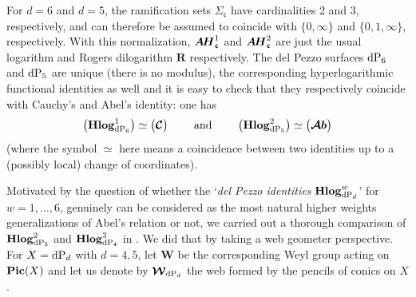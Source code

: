 \documentclass[11pt]{amsart}
\begin{document}
For $d = 6$ and $d = 5$, the ramification sets $\Sigma_{\boldsymbol{\mathfrak c}}$ have cardinalities 2 and 3, respectively, and can therefore be assumed to coincide with 
$\{0,\infty\}$ and 
$\{0,1,\infty\}$, respectively.  With this normalization, 
$\boldsymbol{A\hspace{-0.05cm}H}^1_{\boldsymbol{\mathfrak c}}
$ and $\boldsymbol{A\hspace{-0.05cm}H}^2_{\boldsymbol{\mathfrak c}}$ are just the usual logarithm and Rogers dilogarithm $\boldsymbol{R}$ respectively. 
 The del Pezzo surfaces ${\rm dP}_6$ and ${\rm dP}_5$ are unique (there is no modulus), the corresponding hyperlogarithmic functional identities as well and it is easy to check that they respectively coincide with Cauchy's and Abel's identity: one has 
$$
\big({\bf Hlog}^{1}_{ {\rm dP}_6}\big) \simeq  \big( \boldsymbol{\mathcal C} \big)
\qquad 
\mbox{ and } 
\qquad 
\big({\bf Hlog}^{2}_{ {\rm dP}_5}\big)
\simeq 
\big( \boldsymbol{\mathcal Ab}\big)
$$
(where the symbol $\simeq$ here means a coincidence between two identities up to a  (possibly local) change of coordinates).


Motivated by the question of whether the  `{\it del Pezzo identities  ${\bf Hlog}^{w}_{ {\rm dP}_d}$}' for $w=1,\ldots,6$,  genuinely can be considered as the most natural higher weights generalizations of Abel's relation or not, we carried out a thorough comparison of ${\bf Hlog}^{2}_{ {\rm dP}_5}$ and ${\bf Hlog}^{3}_{ {\rm dP}_4}$ in \cite{PirioAFST}. We did that by 
taking a web geometer perspective. For  $X={\rm dP}_d$ with $d=4,5$, let $\boldsymbol{W}$
 be the corresponding Weyl group acting on ${\bf Pic}(X)$ and let us denote by 
 $\boldsymbol{\mathcal W}_{ {\rm dP}_d }$ the web formed by the pencils of conics on $X$. 
 
 
 
\end{document}
